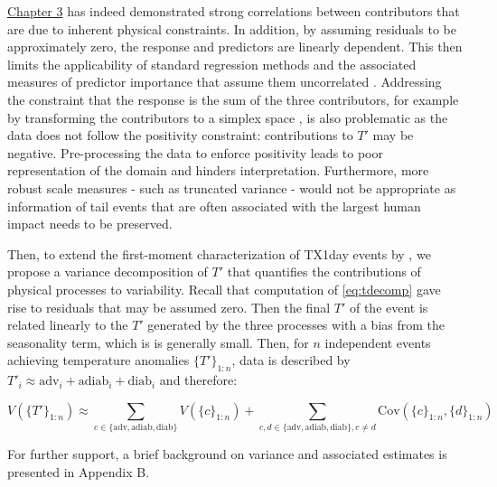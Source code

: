 \documentclass[11pt,a4paper,twoside,openright]{report}
\theoremstyle{definition}
\begin{document}
\hyperref[data]{Chapter 3} has indeed demonstrated strong correlations between contributors that are due to inherent physical constraints. In addition, by assuming residuals to be approximately zero, the response and predictors are linearly dependent. This then limits the applicability of standard regression methods and the associated measures of predictor importance that assume them uncorrelated \citep{hooker_unrestricted_2021}. Addressing the constraint that the response is the sum of the three contributors, for example by transforming the contributors to a simplex space \citep{greenacre_compositional_2021}, is also problematic as the data does not follow the positivity constraint: contributions to \(T'\) may be negative. Pre-processing the data to enforce positivity leads to poor representation of the domain and hinders interpretation. Furthermore, more robust scale measures - such as truncated variance - would not be appropriate as information of tail events that are often associated with the largest human impact needs to be preserved.

Then, to extend the first-moment characterization of TX1day events by \cite{rothlisberger_quantifying_2023}, we propose a variance decomposition of \(T'\) that quantifies the contributions of physical processes to variability. Recall that computation of \eqref{eq:tdecomp} gave rise to residuals that may be assumed zero. Then the final \(T'\) of the event is related linearly to the \(T'\) generated by the three processes with a bias from the seasonality term, which is is generally small. Then, for \(n\) independent events achieving temperature anomalies \(\{ T' \}_{1:n}\), data is described by \({T'}_i \approx \text{adv}_i +\text{adiab}_i +\text{diab}_i\) and therefore:

\begin{equation}
   V(\{ T' \}_{1:n}) \approx \sum_{c \in \{\text{adv},\text{adiab},\text{diab}\}} V(\{ c \}_{1:n} ) + \sum_{c, d \in \{\text{adv},\text{adiab},\text{diab}\} , c\neq d} \text{Cov}(\{ c \}_{1:n} ,\{ d \}_{1:n})
\label{eq:vardecomp}
\end{equation}

For further support, a brief background on variance and associated estimates is presented in Appendix B.
\end{document}
